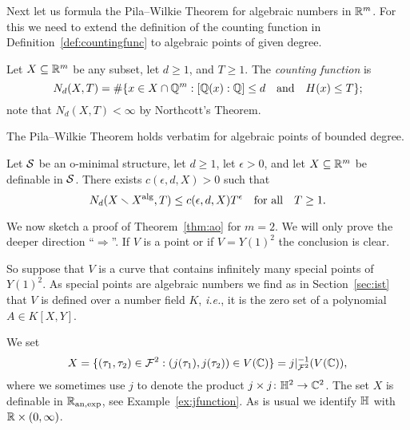 Next let us formula the Pila--Wilkie Theorem for algebraic numbers in
${\mathbb{R}}^m$. For this we need to extend the definition of the counting
function in Definition~\ref{def:countingfunc} to algebraic points of
given degree.

\begin{definition}
  \label{def:countingfunc2}
  Let $X\subseteq{\mathbb{R}}^m$ be any subset, let $d\ge 1$, and $T\ge 1$.
  The \emph{counting
    function} is 
  \begin{equation*}
    N_d (X,T) = \#\{ x\in X\cap {\mathbb{Q}}^m : [{\mathbb{Q}}(x):{\mathbb{Q}}]\le d
    \quad\text{and}\quad
    H(x)\le T\};
  \end{equation*}
  note that $N_d(X,T)<\infty$ by Northcott's Theorem. 
\end{definition}

The Pila--Wilkie Theorem holds verbatim for algebraic points of
bounded degree. 

\begin{theorem}
  \label{thm:pilaalg}
  Let ${\mathcal S}$ be an o-minimal structure, let $d\ge 1$, let $\epsilon
  >0$, and   let $X\subseteq{\mathbb{R}}^m$ be
  definable in ${\mathcal S}$. 
  There exists  $c(\epsilon,d,X)>0$ such that
  \begin{equation*}
    N_d(X\smallsetminus X^{\mathrm{alg}},T)\le c(\epsilon,d,X) T^\epsilon \quad\text{for
      all}\quad T\ge 1.
  \end{equation*}
\end{theorem}

We now  sketch a proof  of Theorem~\ref{thm:ao} for $m=2$.
We will only prove the deeper direction ``$\Longrightarrow$''.
If $V$ is a point or if $V=Y(1)^2$ the conclusion is clear.

So suppose that $V$ is a curve that  contains infinitely many special points
of $Y(1)^2$. As special points are algebraic numbers we find as in Section~\ref{sec:ist} that
$V$ is defined over a number field $K$, \textit{i.e.}, it is the
zero set of a polynomial $A \in K[X,Y]$.

We set
\begin{equation}
  \label{def:Xao}
  X = \{(\tau_1,\tau_2) \in {\mathcal F}^2 : (j(\tau_1),j(\tau_2)) \in V({\mathbb{C}}) \} =
  j|_{{\mathcal F}^2}^{-1}(V({\mathbb{C}})),
\end{equation}
where we sometimes use $j$ to denote the product $j\times j\colon
{\mathbb{H}}^2\rightarrow{\mathbb{C}}^2$. The set $X$ is definable in ${{\mathbb{R}}_{\mathrm{an,exp}}}$, see
Example~\ref{ex:jfunction}.
As is usual we identify ${\mathbb{H}}$ with ${\mathbb{R}} \times (0,\infty)$. 

